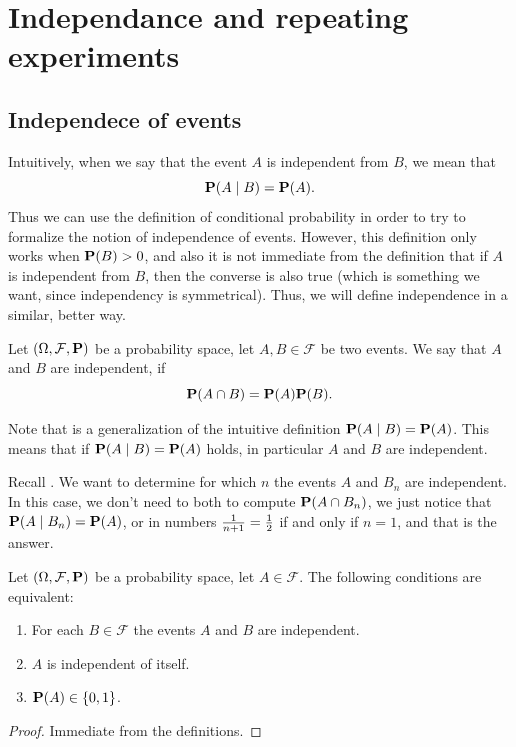 \documentclass[11pt,a4paper]{article}
\begin{document}
\newpage

\section{Independance and repeating experiments}
\subsection{Independece of events}
Intuitively, when we say that the event $A$ is independent from $B$,
we mean that
\[
  \mathbf{P}(A \mid B) = \mathbf{P}(A).
\]
Thus we can use the definition of conditional probability in order
to try to formalize the notion of independence of events.
However, this definition only works when $\mathbf{P}(B) > 0$,
and also it is not immediate from the definition that if $A$ is independent
from $B$, then the converse is also true (which is something we want,
since independency is symmetrical).
Thus, we will define independence in a similar, better way.

\begin{definition}
  \label{def:independence-of-two-events}
  Let $(\Omega, \mathcal F, \mathbf{P})$ be a probability space, let 
  $A,B \in \mathcal F$ be two events. We say that $A$ and $B$ are independent,
  if
  \[
    \mathbf{P}(A \cap B) = \mathbf{P}(A) \mathbf{P}(B).
  \]
\end{definition}

\begin{remark}
  Note that  is a generalization
  of the intuitive definition $\mathbf{P}(A \mid B) = \mathbf{P}(A)$.
  This means that if $\mathbf{P}(A \mid B) = \mathbf{P}(A)$ holds,
  in particular $A$ and $B$ are independent.
\end{remark}

\begin{example}
  Recall .
  We want to determine for which $n$ the events $A$ and $B_n$
  are independent.
  In this case, we don't need to both to compute $\mathbf{P}(A \cap B_n)$,
  we just notice that $\mathbf{P}(A \mid B_n) = \mathbf{P}(A)$,
  or in numbers $\frac{1}{n+1} = \frac{1}{2}$ if and only if $n = 1$,
  and that is the answer.
\end{example}

\begin{proposition}
  Let $(\Omega, \mathcal F, \mathbf{P})$ be a probability space,
  let $A \in \mathcal F$. The following conditions are equivalent:
  \begin{enumerate}
    \item[(1)] For each $B \in \mathcal F$ the events $A$ and $B$ are independent.
    \item[(2)] $A$ is independent of itself.
    \item[(3)] $\mathbf{P}(A) \in \{0, 1\}$.
  \end{enumerate}
\end{proposition}
\begin{proof}
  Immediate from the definitions.
\end{proof}
\end{document}
